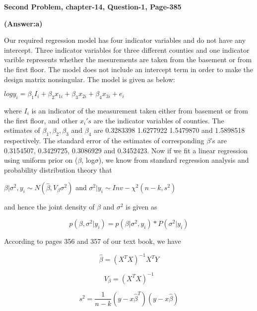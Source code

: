 \documentclass[10pt]{article}
\begin{document}
\begin{center}
\textbf{ Second Problem, chapter-14, Question-1, Page-385}
\end{center}
\begin{center}
\textbf{(Answer:a)}
\end{center}
Our required regression model has four indicator variables and do not have any intercept. Three indicator variables for three different counties and one indicator varible represents whether the mesurements are taken from the basement or from the first floor. The model does not include an intercept term in order to make the design matrix nonsingular. The model is given as below: 
\begin{center}
$logy_{i}=\beta_{1}I_{i}+\beta_{2}x_{1i}+\beta_{3}x_{2i}+\beta_{4}x_{3i}+e_{i}$
\end{center}
where $I_{i}$ is an indicator of the measurement taken either from basement or from the first floor, and  other $x_{i}'s$ are the indicator variables of counties. The estimates of $\beta_{1}, \beta_{2}, \beta_{3}$ and $\beta_{4}$ are 0.3283398 1.6277922 1.5479870 and 1.5898518 respectively. The standard error of the estimates of corresponding $\beta$'s are 0.3154507, 0.3429725, 0.3086929 and 0.3452423. Now if we fit a linear regression using uniform prior on ($\beta$, log$\sigma$), we know from standard regression analysis and probability distribution theory that
\begin{center} 
$\beta|\sigma^{2},y_{i}\sim N(\hat{\beta}, V_{\beta} \sigma^{2})$
and $\sigma^{2}|y_{i} \sim Inv-\chi^{2}(n-k,s^{2})$
\end{center}
and hence the joint density of $\beta$ and $\sigma^{2}$ is given as
\begin{center}
\begin{equation}
p(\beta,\sigma^{2}|y_{i}) = p(\beta|\sigma^{2},y_{i})*P(\sigma^{2}|y_{i})
\end{equation}
\end{center}
According to pages 356 and 357 of our text book, we have
\begin{center}
\begin{equation}
\hat{\beta}=(X^{T}X)^{-1}X^{T}Y
\end{equation}
\end{center}
\begin{center}
\begin{equation}
V_{\beta}=(X^{T}X)^{-1}
\end{equation}
\end{center}
\begin{center}
\begin{equation}
s^{2}=\frac{1}{n-k}(y-x\hat{\beta}^{T})(y-x\hat{\beta})
\end{equation}
\end{center}
\end{document}
